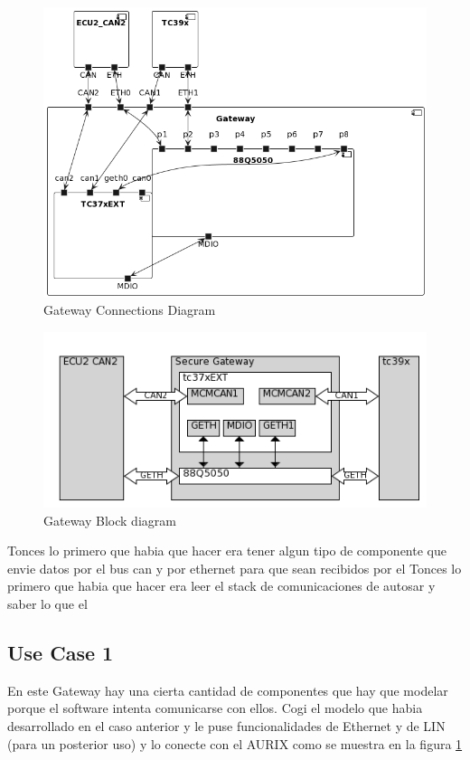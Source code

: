 \begin{figure}[!htb]
 \centering
 \includegraphics[width=\textwidth]{img/GWConnectionsDiagram.png}
 \caption{Gateway Connections Diagram}
 \label{fig:connections-diagram}
\end{figure}

\begin{figure}[!htb]
 \centering
 \includegraphics[width=\textwidth]{img/gateway_block_diagram.png}
 \caption{Gateway Block diagram}
 \label{fig:block diagram}
\end{figure}

Tonces lo primero que habia que hacer era tener algun tipo de componente que envie datos por el bus can y por ethernet para que sean recibidos por el 
Tonces lo primero que habia que hacer era leer el stack de comunicaciones de autosar y saber lo que el 
\subsection{Use Case 1}
En este Gateway hay una cierta cantidad de componentes que hay que modelar porque el software intenta comunicarse con ellos. Cogi el modelo que habia desarrollado en el caso anterior y le puse funcionalidades de Ethernet y de LIN (para un posterior uso) y lo conecte con el AURIX como se muestra en la figura \ref{fig:connections-diagram}


